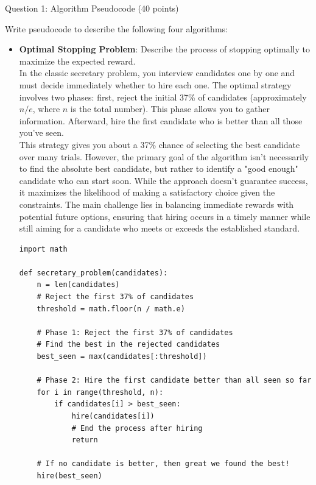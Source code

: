\documentclass[12pt]{exam}
\begin{document}
\begin{questions}


\question[20] Question 1: Algorithm Pseudocode (40 points)
\addpoints

Write pseudocode to describe the following four algorithms:\\

\begin{itemize}
    \item \textbf{Optimal Stopping Problem}: Describe the process of stopping optimally to maximize the expected reward.\\

    In the classic secretary problem, you interview candidates one by one and must decide immediately whether to hire each one. The optimal strategy involves two phases: first, reject the initial 37\% of candidates (approximately  $n/e$, where $n$ is the total number). This phase allows you to gather information. Afterward, hire the first candidate who is better than all those you’ve seen. \\

    This strategy gives you about a 37\% chance of selecting the best candidate over many trials. However, the primary goal of the algorithm isn’t necessarily to find the absolute best candidate, but rather to identify a "good enough" candidate who can start soon. While the approach doesn't guarantee success, it maximizes the likelihood of making a satisfactory choice given the constraints. The main challenge lies in balancing immediate rewards with potential future options, ensuring that hiring occurs in a timely manner while still aiming for a candidate who meets or exceeds the established standard. \\

    \begin{lstlisting}
import math

def secretary_problem(candidates):
    n = len(candidates)
    # Reject the first 37% of candidates
    threshold = math.floor(n / math.e)

    # Phase 1: Reject the first 37% of candidates
    # Find the best in the rejected candidates
    best_seen = max(candidates[:threshold])  

    # Phase 2: Hire the first candidate better than all seen so far
    for i in range(threshold, n):
        if candidates[i] > best_seen:
            hire(candidates[i])
            # End the process after hiring
            return  

    # If no candidate is better, then great we found the best!
    hire(best_seen)


\end{lstlisting}
\end{itemize}
\end{questions}
\end{document}
